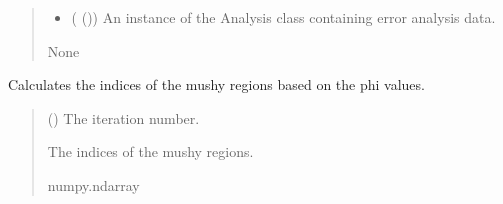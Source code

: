 \documentclass[a4paper,11pt,english,openany]{sphinxmanual}
\begin{document}
\begin{fulllineitems}
\begin{fulllineitems}
\begin{quote}
\begin{description}
\begin{itemize}
\item {} 
\sphinxAtStartPar
{} ({\hyperref[\detokenize{api/spyice.postprocess.analysis:src.spyice.postprocess.analysis.Analysis}]{}} ()) \textendash{} An instance of the Analysis class containing error analysis data.

\end{itemize}

\sphinxAtStartPar
None

\end{description}\end{quote}

\end{fulllineitems}


\begin{fulllineitems}
\label{\detokenize{api/spyice.postprocess.visualise_model:src.spyice.postprocess.visualise_model.VisualiseModel.phi_slope}}
\pysigstartsignatures
\pysiglinewithargsret
{}
{}
{}
\pysigstopsignatures
\sphinxAtStartPar
Calculates the indices of the mushy regions based on the phi values.
\begin{quote}\begin{description}
\sphinxAtStartPar
{} () \textendash{} The iteration number.

\sphinxAtStartPar
The indices of the mushy regions.

\sphinxAtStartPar
numpy.ndarray

\end{description}\end{quote}

\end{fulllineitems}



\end{fulllineitems}
\end{document}
